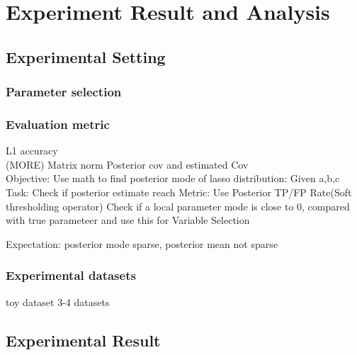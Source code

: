 \chapter{Experiment Result and Analysis}
\label{Chapter4}
\section{Experimental Setting}
\subsection{Parameter selection}
\subsection{Evaluation metric}
L1 accuracy\\
(MORE) Matrix norm Posterior cov and estimated Cov\\

Objective: Use math to find posterior mode of lasso distribution: Given a,b,c
Task: Check if posterior estimate reach 
Metric: Use Posterior TP/FP Rate(Soft thresholding operator) Check if a local parameter mode is close to 0, compared with true parameteer and use this for 
Variable Selection

Expectation: posterior mode sparse, posterior mean not sparse

\subsection{Experimental datasets}
toy dataset
3-4 datasets
\section{Experimental Result}
\begin{table}[!h]
	\caption{Experiment Result on Hitters dataset}
	\label{table:Hitter}
\end{table}

